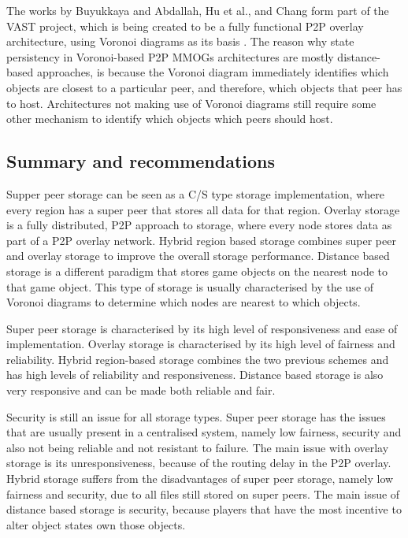 \documentclass[10pt,a4paper,journal,cspaper,compsoc]{IEEEtran}
\begin{document}
The works by Buyukkaya and Abdallah, Hu et al., and Chang form part of the VAST project, which is being created to be a fully functional P2P overlay
architecture, using Voronoi diagrams as its basis \cite{VAST}. The reason why state persistency in Voronoi-based P2P MMOGs architectures are mostly
distance-based approaches, is because the Voronoi diagram immediately identifies which objects are closest to a particular peer, and therefore, which
objects that peer has to host. Architectures not making use of Voronoi diagrams still require some other mechanism to identify which objects which
peers should host.

\subsection{Summary and recommendations}
\label{recommendations}

Supper peer storage can be seen as a C/S type storage implementation, where every region has a super peer that stores all data for that region.
Overlay storage is a fully distributed, P2P approach to storage, where every node stores data as part of a P2P overlay network. Hybrid region based
storage combines super peer and overlay storage to improve the overall storage performance. Distance based storage is a different paradigm that
stores game objects on the nearest node to that game object. This type of storage is usually characterised by the use of Voronoi diagrams to
determine which nodes are nearest to which objects.

Super peer storage is characterised by its high level of responsiveness and ease of implementation. Overlay storage is characterised by its high
level of fairness and reliability. Hybrid region-based storage combines the two previous schemes and has high levels of reliability and
responsiveness. Distance based storage is also very responsive and can be made both reliable and fair.

Security is still an issue for all storage types. Super peer storage has the issues that are usually present in a centralised system, namely low
fairness, security and also not being reliable and not resistant to failure. The main issue with overlay storage is its unresponsiveness, because of
the routing delay in the P2P overlay. Hybrid storage suffers from the disadvantages of super peer storage, namely low fairness and security, due to
all files still stored on super peers. The main issue of distance based storage is security, because players that have the most incentive to alter
object states own those objects.
\end{document}
